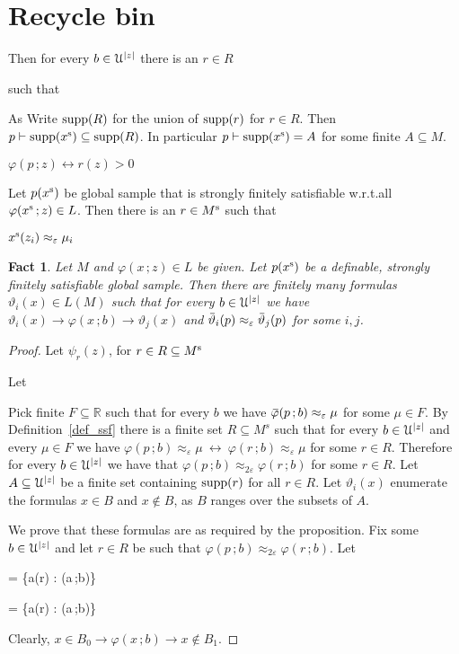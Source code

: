 \documentclass[10pt,openany]{article}
\def\proves{\vdash}
\def\proves{\vdash}
\def\RR{\mathds R}
\def\supp{\mathop{\rm supp}}
\newcommand{\sbar}[1]{\mkern 3mu\overline{\mkern-3mu#1\mkern-1mu}\mkern 1mu}
\newcommand{\barU}{\mkern 2mu\overline{\mkern-2mu\U\mkern-2mu}\mkern 2mu}
\newcommand{\barL}{\mkern 2.5mu\overline{\mkern-2.5mu L\mkern-3.5mu}\mkern 3.5mu}
\def\imp{\rightarrow}
\def\iff{\leftrightarrow}
\def\U{\EuScript U}
\def\theta{\vartheta}
\def\phi{\varphi}
\def\epsilon{\varepsilon}
\newcounter{thm}[section]
\theoremstyle{mio}
\newtheorem{fact}[thm]{Fact}
\theoremstyle{liscio}
\begin{document}
\section{Recycle bin}



%
Then for every $b\in\U^{|z|}$ there is an $r\in R$

\ceq{\hfill p(x^{\rm s})}{\proves}{x^{\rm s}(b)>0\iff r(b)>0} such that

As 
Write $\supp(R)$ for the union of $\supp(r)$ for $r\in R$.
%
Then $p\proves \supp(x^{\rm s}) \subseteq \supp(R)$.
%
In particular $p\proves \supp(x^{\rm s}) = A$ for some finite $A\subseteq M$.
%


$\phi(p\,;z) \iff r(z)>0$






Let $p(x^{\rm s})$ be global sample that is strongly finitely satisfiable w.r.t.\@ all $\phi(x^{\rm s}\,;z)\in L$.
%
Then there is an $r\in M^{\rm s}$ such that 

$x^{\rm s}(z_i)\approx_\epsilon\mu_i$




\begin{fact}
  Let $M$ and $\phi(x\,;z)\in L$ be given.
  Let $p(x^{\rm s})$ be a definable, strongly finitely satisfiable global sample.
  Then there are finitely many formulas $\theta_i(x)\in L(M)$ such that for every $b\in\U^{|z|}$ we have $\theta_i(x)\imp\phi(x\,;b)\imp\theta_j(x)$ and $\sbar\theta_i(p)\approx_\epsilon\sbar\theta_j(p)$ for some $i,j$.
\end{fact}

\begin{proof}
  Let $\psi_r(z)$, for $r\in R\subseteq M^{\rm s}$

  Let 


  Pick finite $F\subseteq\RR$ such that for every $b$ we have $\sbar\phi(p\,;b)\approx_{\epsilon}\mu$ for some $\mu\in F$.
  By Definition~\ref{def_ssf} there is a finite set $R\subseteq M^s$ such that for every $b\in\U^{|z|}$ and every $\mu\in F$ we have $\phi(p\,;b)\approx_{\epsilon}\mu\ \iff\ \phi(r\,;b)\approx_{\epsilon}\mu$ for some $r\in R$.
  Therefore for every $b\in\U^{|z|}$ we have that $\phi(p\,;b)\approx_{2\epsilon}\phi(r\,;b)$ for some $r\in R$.
  Let $A\subseteq\U^{|z|}$ be a finite set containing $\supp(r)$ for all $r\in R$. 
  Let $\theta_i(x)$ enumerate the formulas $x\in B$ and $x\notin B$, as $B$ ranges over the subsets of $A$.
  
  We prove that these formulas are as required by the proposition.
  Fix some $b\in\U^{|z|}$ and let $r\in R$ be such that $\phi(p\,;b)\approx_{2\epsilon}\phi(r\,;b)$.
  Let

  {=}
  {\{a\in\supp(r) : \phi(a\,;b)\}}
  
  {=}
  {\{a\in\supp(r) : \neg\phi(a\,;b)\}}

  Clearly, $x\in B_0\imp \phi(x\,;b)\imp x\notin B_1$.
\end{proof}
\end{document}
